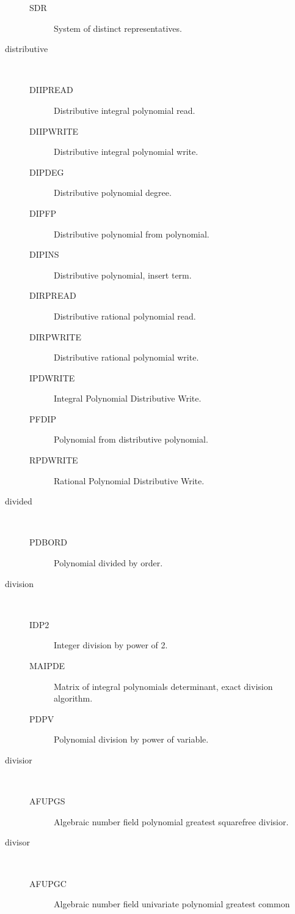 \begin{description}
\begin{description}
  \item[SDR]  System of distinct representatives.
  \end{description}
\item[distributive] \ \ 
  \begin{description}
  \item[DIIPREAD]  Distributive integral polynomial read.
  \item[DIIPWRITE]  Distributive integral polynomial write.
  \item[DIPDEG]  Distributive polynomial degree.
  \item[DIPFP]  Distributive polynomial from polynomial.
  \item[DIPINS]  Distributive polynomial, insert term.
  \item[DIRPREAD]  Distributive rational polynomial read.
  \item[DIRPWRITE]  Distributive rational polynomial write.
  \item[IPDWRITE]  Integral Polynomial Distributive Write.
  \item[PFDIP]  Polynomial from distributive polynomial.
  \item[RPDWRITE]  Rational Polynomial Distributive Write.
  \end{description}
\item[divided] \ \ 
  \begin{description}
  \item[PDBORD]  Polynomial divided by order.
  \end{description}
\item[division] \ \ 
  \begin{description}
  \item[IDP2]  Integer division by power of 2.
  \item[MAIPDE]  Matrix of integral polynomials determinant, exact division
    algorithm.
  \item[PDPV]  Polynomial division by power of variable.
  \end{description}
\item[divisior] \ \ 
  \begin{description}
  \item[AFUPGS]  Algebraic number field polynomial greatest squarefree
    divisior.
  \end{description}
\item[divisor] \ \ 
  \begin{description}
  \item[AFUPGC]  Algebraic number field univariate polynomial greatest common

\end{description}
\end{description}

